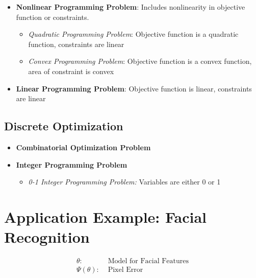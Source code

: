 \documentclass[
]{article}
\begin{document}
\begin{itemize}
\item \textbf{Nonlinear Programming Problem}: \newline
Includes nonlinearity in objective function or constraints. 
\begin{itemize}
\item \textit{Quadratic Programming Problem}: \newline
Objective function is a quadratic function, constraints are linear  
\item \textit{Convex Programming Problem}: \newline
Objective function is a convex function, area of constraint is convex
\end{itemize}
\item \textbf{Linear Programming Problem}: \newline
Objective function is linear, constraints are linear  
\end{itemize}

\hypertarget{discrete-optimization}{%
\subsection{Discrete Optimization}\label{discrete-optimization}}

\begin{itemize}
\item \textbf{Combinatorial Optimization Problem}  
\item \textbf{Integer Programming Problem}
\begin{itemize}
\item \textit{0-1 Integer Programming Problem:} \newline
Variables are either 0 or 1  
\end{itemize}
\end{itemize}

\hypertarget{application-example-facial-recognition}{%
\section{Application Example: Facial
Recognition}\label{application-example-facial-recognition}}

\[\begin{aligned}
\theta:& \text{ Model for Facial Features} \\
\Psi(\theta):& \text{ Pixel Error}
\end{aligned}\]
\end{document}
